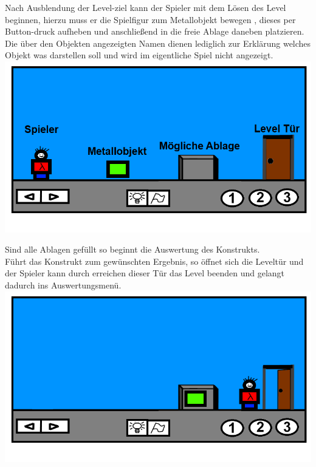 \documentclass{scrartcl}
\begin{document}
\begin{description}
\begin{enumerate}
		\begin{minipage}{1\textwidth}
			\item \label{Levelaufbau:ErsteSchritte} Nach Ausblendung der Level-ziel kann der Spieler mit dem Lösen des Level beginnen, hierzu muss er die Spielfigur zum Metallobjekt bewegen , dieses per Button-druck aufheben und anschließend in die freie Ablage daneben platzieren.\\
			Die über den Objekten angezeigten Namen dienen lediglich zur Erklärung welches Objekt was darstellen soll und wird im eigentliche Spiel nicht angezeigt.\\
			\includegraphics[scale=0.5]{assets/Level1mA}
		\end{minipage}
		
		\begin{minipage}{1\textwidth}
			\item \label{Levelaufbau:Levelende} Sind alle Ablagen gefüllt so beginnt die Auswertung des Konstrukts.\\ Führt das Konstrukt zum gewünschten Ergebnis, so öffnet sich die Leveltür  und der Spieler kann durch erreichen dieser Tür das Level beenden und gelangt dadurch ins Auswertungsmenü.\\
			\includegraphics[scale=0.5]{assets/LevelEnde}
		\end{minipage}
		

\end{enumerate}
\end{description}
\end{document}
